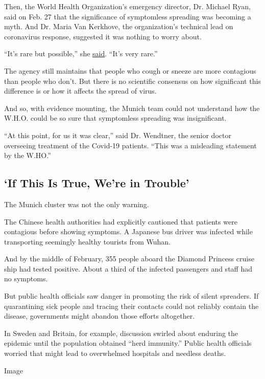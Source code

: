 Then, the World Health Organization's emergency director, Dr. Michael
Ryan, said on Feb. 27 that the significance of symptomless spreading was
becoming a myth. And Dr. Maria Van Kerkhove, the organization's
technical lead on coronavirus response, suggested it was nothing to
worry about.

``It's rare but possible,'' she
\href{https://www.youtube.com/watch?v=SCgCzYAHusA\&t=22m55s}{said}.
``It's very rare.''

The agency still maintains that people who cough or sneeze are more
contagious than people who don't. But there is no scientific consensus
on how significant this difference is or how it affects the spread of
virus.

And so, with evidence mounting, the Munich team could not understand how
the W.H.O. could be so sure that symptomless spreading was
insignificant.

``At this point, for us it was clear,'' said Dr. Wendtner, the senior
doctor overseeing treatment of the Covid-19 patients. ``This was a
misleading statement by the W.HO.''

\hypertarget{if-this-is-true-were-in-trouble}{%
\subsection{`If This Is True, We're in
Trouble'}\label{if-this-is-true-were-in-trouble}}

The Munich cluster was not the only warning.

The Chinese health authorities had explicitly cautioned that patients
were contagious before showing symptoms. A Japanese bus driver was
infected while transporting seemingly healthy tourists from Wuhan.

And by the middle of February, 355 people aboard the Diamond Princess
cruise ship had tested positive. About a third of the infected
passengers and staff had no symptoms.

But public health officials saw danger in promoting the risk of silent
spreaders. If quarantining sick people and tracing their contacts could
not reliably contain the disease, governments might abandon those
efforts altogether.

In Sweden and Britain, for example, discussion swirled about enduring
the epidemic until the population obtained ``herd immunity.'' Public
health officials worried that might lead to overwhelmed hospitals and
needless deaths.

Image

